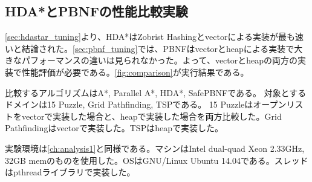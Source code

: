 \documentclass{jsarticle}
\begin{document}
\subsection{HDA*とPBNFの性能比較実験}

\ref{sec:hdastar_tuning}より、HDA*はZobrist Hashingとvectorによる実装が最も速いと結論された。\ref{sec:pbnf_tuning}では、PBNFはvectorとheapによる実装で大きなパフォーマンスの違いは見られなかった。よって、vectorとheapの両方の実装で性能評価が必要である。\ref{fig:comparison}が実行結果である。

比較するアルゴリズムはA*, Parallel A*, HDA*, SafePBNFである。
対象とするドメインは15 Puzzle, Grid Pathfinding, TSPである。
15 Puzzleはオープンリストをvectorで実装した場合と、heapで実装した場合を両方比較した。Grid Pathfindingはvectorで実装した。TSPはheapで実装した。

実験環境は\ref{ch:analysis1}と同様である。マシンはIntel dual-quad Xeon 2.33GHz, 32GB memのものを使用した。OSはGNU/Linux Ubuntu 14.04である。スレッドはpthreadライブラリで実装した。
\end{document}

